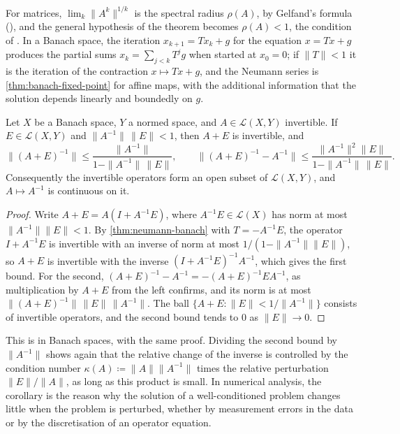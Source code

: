 For matrices, $\lim_k\|A^k\|^{1/k}$ is the spectral radius $\rho(A)$, by Gelfand's formula (), and the general hypothesis of the theorem becomes $\rho(A)<1$, the condition of . In a Banach space, the iteration $x_{k+1}=Tx_k+g$ for the equation $x=Tx+g$ produces the partial sums $x_k=\sum_{j<k}T^jg$ when started at $x_0=0$; if $\|T\|<1$ it is the iteration of the contraction $x\mapsto Tx+g$, and the Neumann series is \cref{thm:banach-fixed-point} for affine maps, with the additional information that the solution depends linearly and boundedly on $g$.

\begin{corollary}
\label{cor:perturbation-banach}
Let $X$ be a Banach space, $Y$ a normed space, and $A\in\mathcal L(X,Y)$ invertible. If $E\in\mathcal L(X,Y)$ and $\|A^{-1}\|\,\|E\|<1$, then $A+E$ is invertible, and
\[
\bigl\|(A+E)^{-1}\bigr\|\le\frac{\|A^{-1}\|}{1-\|A^{-1}\|\,\|E\|},\qquad\bigl\|(A+E)^{-1}-A^{-1}\bigr\|\le\frac{\|A^{-1}\|^2\|E\|}{1-\|A^{-1}\|\,\|E\|} .
\]
Consequently the invertible operators form an open subset of $\mathcal L(X,Y)$, and $A\mapsto A^{-1}$ is continuous on it.
\end{corollary}

\begin{proof}
Write $A+E=A(I+A^{-1}E)$, where $A^{-1}E\in\mathcal L(X)$ has norm at most $\|A^{-1}\|\|E\|<1$. By \cref{thm:neumann-banach} with $T=-A^{-1}E$, the operator $I+A^{-1}E$ is invertible with an inverse of norm at most $1/(1-\|A^{-1}\|\|E\|)$, so $A+E$ is invertible with the inverse $(I+A^{-1}E)^{-1}A^{-1}$, which gives the first bound. For the second, $(A+E)^{-1}-A^{-1}=-(A+E)^{-1}EA^{-1}$, as multiplication by $A+E$ from the left confirms, and its norm is at most $\|(A+E)^{-1}\|\,\|E\|\,\|A^{-1}\|$. The ball $\{A+E: \|E\|<1/\|A^{-1}\|\}$ consists of invertible operators, and the second bound tends to $0$ as $\|E\|\to0$.
\end{proof}

This is  in Banach spaces, with the same proof. Dividing the second bound by $\|A^{-1}\|$ shows again that the relative change of the inverse is controlled by the condition number $\kappa(A)\coloneqq\|A\|\|A^{-1}\|$ times the relative perturbation $\|E\|/\|A\|$, as long as this product is small. In numerical analysis, the corollary is the reason why the solution of a well-conditioned problem changes little when the problem is perturbed, whether by measurement errors in the data or by the discretisation of an operator equation.

